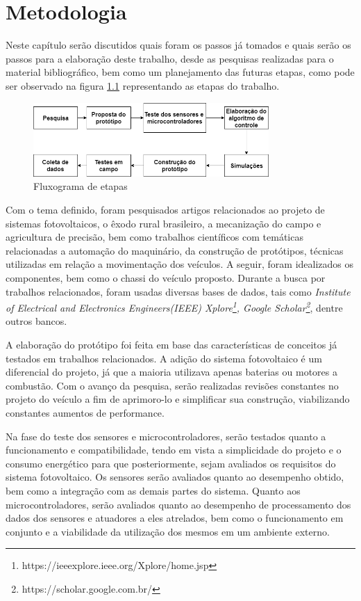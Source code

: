 \chapter{Metodologia}
\label{cap:metodologia}
Neste capítulo serão discutidos quais foram os passos já tomados e quais serão os passos para a elaboração deste trabalho, desde as pesquisas realizadas para o material bibliográfico, bem como um planejamento das futuras etapas, como pode ser observado na figura \ref{fig:metodologia:etapas} representando as etapas do trabalho. 

\begin{figure}[H]
    \centering
    \includegraphics[width=0.8\textwidth]{figuras/metodologia.png}
    \caption{Fluxograma de etapas}
    \label{fig:metodologia:etapas}
\end{figure}

Com o tema definido, foram pesquisados artigos relacionados ao projeto de sistemas fotovoltaicos, o êxodo rural brasileiro, a mecanização do campo e agricultura de precisão, bem como trabalhos científicos com temáticas relacionadas a automação do  maquinário, da construção de protótipos, técnicas utilizadas em relação a movimentação dos veículos. A seguir, foram idealizados os componentes, bem como o chassi do veículo proposto. Durante a busca por trabalhos relacionados, foram usadas diversas bases de dados, tais como  \textit{Institute of Electrical and Electronics Engineers(IEEE) Xplore\footnote{https://ieeexplore.ieee.org/Xplore/home.jsp}, Google Scholar\footnote{https://scholar.google.com.br/}}, dentre outros bancos. 

A elaboração do protótipo foi feita em base das características de conceitos já testados em trabalhos relacionados. A adição do sistema fotovoltaico é um diferencial do projeto, já que a maioria utilizava apenas baterias ou motores a combustão. Com o avanço da pesquisa, serão realizadas revisões constantes no projeto do veículo a fim de aprimoro-lo e simplificar sua construção, viabilizando constantes aumentos de performance. 

Na fase do teste dos sensores e microcontroladores, serão testados quanto a funcionamento e compatibilidade, tendo em vista a simplicidade do projeto e o consumo energético para que posteriormente, sejam avaliados os requisitos do sistema fotovoltaico. Os  sensores serão avaliados quanto ao desempenho obtido, bem como a integração com as demais partes do sistema. Quanto aos microcontroladores, serão avaliados quanto ao desempenho de processamento dos dados dos sensores e atuadores a eles atrelados, bem como o funcionamento em conjunto e a viabilidade da utilização dos mesmos em um ambiente externo.

